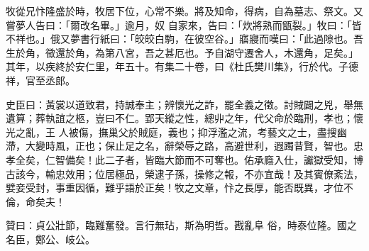\begin{pinyinscope}
 牧從兄忭隆盛於時，牧居下位，心常不樂。將及知命，得病，自為墓志、祭文。又嘗夢人告曰：「爾改名畢。」逾月，奴
 自家來，告曰：「炊將熟而甑裂。」牧曰：「皆不祥也。」俄又夢書行紙曰：「皎皎白駒，在彼空谷。」寤寢而嘆曰：「此過隙也。吾生於角，徵還於角，為第八宮，吾之甚厄也。予自湖守遷舍人，木還角，足矣。」其年，以疾終於安仁里，年五十。有集二十卷，曰《杜氏樊川集》，行於代。子德祥，官至丞郎。



 史臣曰：黃裳以道致君，持誠奉主；辨懷光之詐，罷全義之徵。討賊闢之兇，舉無遺算；葬執誼之柩，豈曰不仁。郢天縱之性，總丱之年，代父命於臨刑，孝也；懷光之亂，王
 人被傷，撫巢父於賊庭，義也；抑浮濫之流，考藝文之士，盡搜幽滯，大變時風，正也；保止足之名，辭榮辱之路，高避世利，遐躅昔賢，智也。忠孝全矣，仁智備矣！此二子者，皆臨大節而不可奪也。佑承廕入仕，讞獄受知，博古該今，輸忠效用；位居極品，榮逮子孫，操修之報，不亦宜哉！及其賓僚紊法，嬖妾受封，事重因循，難乎語於正矣！牧之文章，忭之長厚，能否既異，才位不倫，命矣夫！



 贊曰：貞公壯節，臨難奮發。言行無玷，斯為明哲。戡亂阜
 俗，時泰位隆。國之名臣，鄭公、岐公。



\end{pinyinscope}